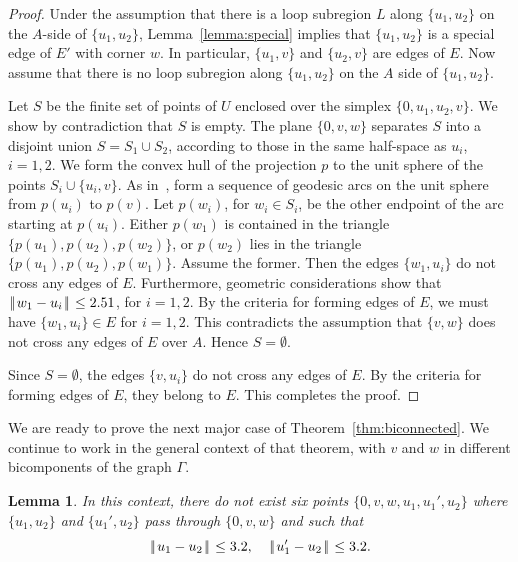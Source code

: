 \documentclass[11pt]{amsart}
\def\|{{\hskip0.1em|\hskip-0.15em|\hskip0.1em}}
\newtheorem{lemma}{Lemma}
\begin{document}
\begin{proof} Under the assumption that 
there is a loop subregion $L$ along 
$\{u_1,u_2\}$ on the $A$-side
of $\{u_1,u_2\}$, Lemma~\ref{lemma:special} implies that
$\{u_1,u_2\}$ is a special edge of $E'$ with
corner $w$.  In particular, $\{u_1,v\}$ and $\{u_2,v\}$ are
edges of $E$.  Now assume that there is no loop subregion along
$\{u_1,u_2\}$ on the $A$ side of $\{u_1,u_2\}$.

Let $S$ be the finite set of points of $U$ enclosed
over the simplex $\{0,u_1,u_2,v\}$.  We show by contradiction
that $S$ is empty.
The plane $\{0,v,w\}$ separates
$S$ into a disjoint union $S = S_1\cup S_2$, according to those
in the same half-space as $u_i$, $i=1,2$.
We form the convex hull of the projection $p$ to the unit sphere of the 
points $S_i\cup\{u_i,v\}$.  As in~\cite[Sec.~12.13]{Hales:2006:DCG},
form a sequence of geodesic arcs on the unit sphere from $p(u_i)$
to $p(v)$.  Let $p(w_i)$, for $w_i\in S_i$, be the other endpoint
of the arc starting at $p(u_i)$.  Either $p(w_1)$ is contained in the
triangle $\{p(u_1),p(u_2),p(w_2)\}$, or
$p(w_2)$ lies in the triangle $\{p(u_1),p(u_2),p(w_1)\}$.  Assume
the former.  Then the edges $\{w_1,u_i\}$ do not cross any edges
of $E$.  Furthermore, geometric considerations show that
$\|w_1-u_i\|\le 2.51$, for $i=1,2$.  By the criteria for forming
edges of $E$, we must have $\{w_1,u_i\}\in E$ for $i=1,2$.  This
contradicts the assumption that $\{v,w\}$ does not cross any edges
of $E$ over $A$.  Hence $S=\emptyset$.

Since $S=\emptyset$, the edges $\{v,u_i\}$ do not cross any edges
of $E$.  By the criteria for forming edges of $E$, they belong to $E$.
This completes the proof.
\end{proof}

We are ready to prove the next major case of Theorem~\ref{thm:biconnected}.
We continue to work in the general context of that theorem, with $v$ and $w$
in different bicomponents of the graph $\Gamma$.

\begin{lemma}\label{lemma:double-cross}  
In this context, there do not exist six points $\{0,v,w,u_1,u_1',u_2\}$
where $\{u_1,u_2\}$ and $\{u_1',u_2\}$ pass through $\{0,v,w\}$ and such that
  $$\|u_1-u_2\|\le 3.2,\quad \|u_1'-u_2\|\le 3.2.$$
\end{lemma}
\end{document}

